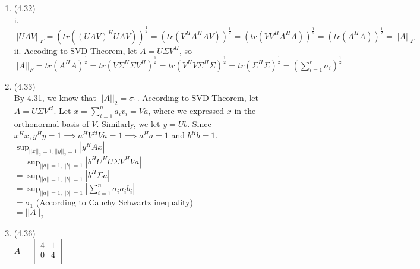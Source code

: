 \documentclass[letterpaper,12pt]{article}
\theoremstyle{definition}
\begin{document}
\begin{enumerate}
	\item(4.32)\\
	i. $||UAV||_{F} = (tr((UAV)^{H}UAV))^{\frac{1}{2}} = (tr(V^{H}A^{H}AV))^{\frac{1}{2}} = (tr(VV^{H}A^{H}A))^{\frac{1}{2}} = (tr(A^{H}A))^{\frac{1}{2}} = ||A||_{F}$\\
	ii. Accoding to SVD Theorem, let $A = U\Sigma V^{H}$, so $||A||_{F} = tr(A^{H}A)^{\frac{1}{2}} = tr(V\Sigma^{H}\Sigma V^{H})^{\frac{1}{2}}  = tr(V^{H}V\Sigma^{H}\Sigma)^{\frac{1}{2}} = tr(\Sigma^{H}\Sigma)^{\frac{1}{2}} = (\sum_{i = 1}^{r} \sigma_{i})^{\frac{1}{2}}$\\

	\item(4.33)\\
	By 4.31, we know that $||A||_{2} = \sigma_{1}$. According to SVD Theorem, let $A = U\Sigma V^{H}$. Let $x = \sum_{i = 1}^{n} a_{i}v_{i} = Va$, where we expressed $x$ in the orthonormal basis of $V$. Similarly, we let $y = Ub$. Since $x^{H}x, y^{H}y = 1 \implies a^{H}V^{H}Va = 1 \implies a^{H}a = 1$ and $b^{H}b = 1$.\\
	$\sup_{||x||_{2} = 1, ||y||_{2} = 1}|y^{H}Ax|$\\
	$ = \sup_{||a|| = 1, ||b|| = 1} |b^{H}U^{H}U\Sigma V^{H} Va|$\\
	$= \sup_{||a|| = 1, ||b|| = 1} | b^{H} \Sigma a|$\\
	$=  \sup_{||a|| = 1, ||b|| = 1} |\sum_{i = 1}^{n}\sigma_{i}a_{i}b_{i}| $\\
	$= \sigma_{1}$ (According to Cauchy Schwartz inequality)\\
	$= ||A||_{2} $\\

	\item(4.36)\\
	$A =  \begin{bmatrix}
	  4 &  1\\
	   0 & 4\\
	\end{bmatrix}$



\end{enumerate}
\end{document}

